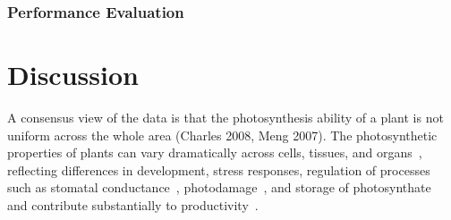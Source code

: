 \documentclass{bioinfo}
\begin{document}


\subsubsection{Performance Evaluation}


%
%




\section{Discussion}

A consensus view of the data is that the photosynthesis ability of a plant is not uniform across the whole area (Charles 2008, Meng 2007).
%
The photosynthetic properties of plants can vary dramatically across cells, tissues, and organs~\citep{}, reflecting differences in development, stress responses, regulation of processes such as stomatal conductance~\citep{}, photodamage~\citep{}, and storage of photosynthate~\citep{} and contribute substantially to productivity~\citep{}.
\end{document}
